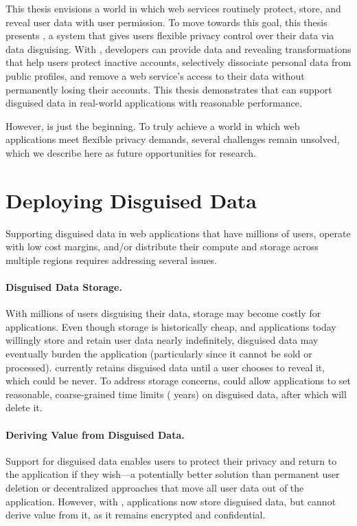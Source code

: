 This thesis envisions a world in which web services routinely
protect, store, and reveal \xxed user data with user permission.
%
To move towards this goal, this thesis presents \sys, a system that gives users 
flexible privacy control over their data via data disguising.
%
With \sys, developers can provide data \xxing and revealing transformations that
help users protect inactive accounts, selectively dissociate personal data from
public profiles, and remove a web service's access to their data without
permanently losing their accounts.
%
This thesis demonstrates that \sys can support disguised data in real-world
applications with reasonable performance.
%

%
However, \sys is just the beginning. To truly achieve a world in which web
applications meet flexible privacy demands, several challenges remain unsolved,
which we describe here as future opportunities for research.
%

\section{Deploying Disguised Data}
\label{s:deploying}

Supporting disguised data in web applications that have millions of users,
operate with low cost margins, and/or distribute their compute and storage
across multiple regions requires addressing several issues.

%
\paragraph{Disguised Data Storage.} 
With millions of users disguising their data, storage may become costly for
applications.
%
Even though storage is historically cheap, and applications today willingly
store and retain user data nearly indefinitely, disguised data may eventually
burden the application (particularly since it cannot be sold or processed).
%
\sys currently retains disguised data until a user
chooses to reveal it, which could be never.
%
To address storage concerns, \sys could allow applications to set reasonable,
coarse-grained time limits ( years) on disguised data, after which \sys
will delete it.
%

%
\paragraph{Deriving Value from Disguised Data.} 
%
Support for disguised data enables users to protect their privacy and return to
the application if they wish---a potentially better solution than permanent user
deletion or decentralized approaches that move all user data out of the
application. However, with \sys, applications now store disguised data, but
cannot derive value from it, as it remains encrypted and confidential.

